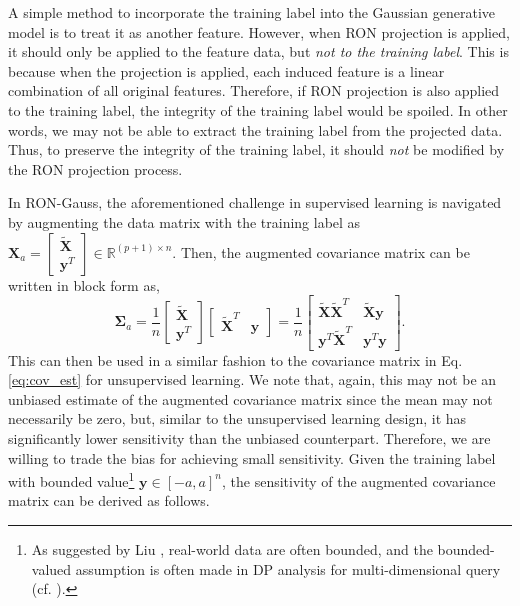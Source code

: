 \documentclass[USenglish,oneside,twocolumn]{article}
\theoremstyle{definition}
\theoremstyle{remark}
\theoremstyle{plain}
\theoremstyle{plain}
\begin{document}
A simple method to incorporate the training label into the Gaussian
generative model is to treat it as another feature. However, when
RON projection is applied, it should only be applied to the feature
data, but \emph{not to the training label}. This is because when the
projection is applied, each induced feature is a linear combination
of all original features. Therefore, if RON projection is also applied
to the training label, the integrity of the training label would be
spoiled. In other words, we may not be able to extract the training
label from the projected data. Thus, to preserve the integrity of
the training label, it should \emph{not} be modified by the RON projection
process.

In RON-Gauss, the aforementioned challenge in supervised learning
is navigated by augmenting the data matrix with the training label as $\mathbf{X}_{a}=\begin{bmatrix}\widetilde{\mathbf{X}}\\
\mathbf{y}^{T}
\end{bmatrix}\in\mathbb{R}^{(p+1)\times n}$. Then, the augmented covariance matrix can be written in block form
as,
\begin{equation}
\boldsymbol{\Sigma}_{a}=\frac{1}{n}\begin{bmatrix}\widetilde{\mathbf{X}}\\
\mathbf{y}^{T}
\end{bmatrix}\begin{bmatrix}\widetilde{\mathbf{X}}^{T} & \mathbf{y}\end{bmatrix}=\frac{1}{n}\begin{bmatrix}\widetilde{\mathbf{X}}\widetilde{\mathbf{X}}^{T} & \widetilde{\mathbf{X}}\mathbf{y}\\
\mathbf{y}^{T}\widetilde{\mathbf{X}}^{T} & \mathbf{y}^{T}\mathbf{y}
\end{bmatrix}.\label{eq:augmented_cov}
\end{equation}
This can then be used in a similar fashion to the covariance
matrix in Eq. \eqref{eq:cov_est} for unsupervised learning. We note
that, again, this may not be an unbiased estimate of the augmented
covariance matrix since the mean may not necessarily be zero, but,
similar to the unsupervised learning design, it has significantly
lower sensitivity than the unbiased counterpart. Therefore, we are willing
to trade the bias for achieving small sensitivity. Given the training
label with bounded value\footnote{As suggested by Liu \cite{RefWorks:372}, real-world data are often
bounded, and the bounded-valued
assumption is often made in DP analysis for multi-dimensional query
(cf. \cite{RefWorks:195,RefWorks:178,RefWorks:338,RefWorks:249}).} $\mathbf{y}\in[-a,a]^{n}$, the sensitivity of the augmented covariance matrix can be derived as follows.
\end{document}
